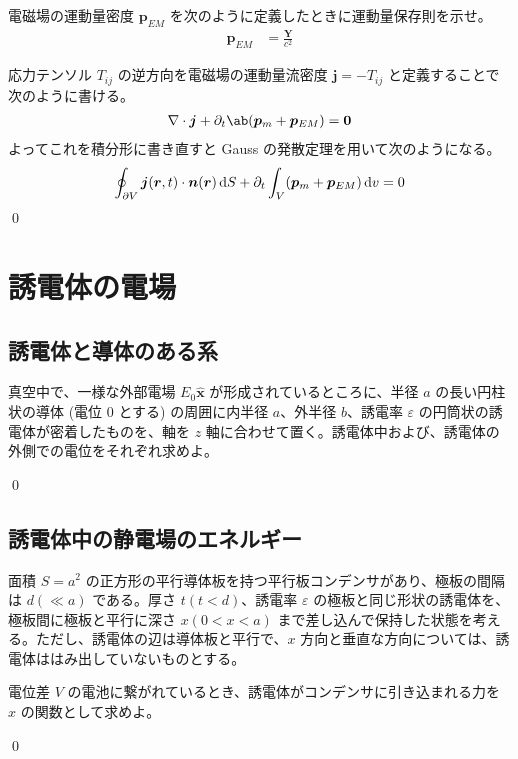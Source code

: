 \documentclass[uplatex,dvipdfmx,a4paper,11pt]{jlreq}
\makeatletter
\newcommand{\rr}{\bm{r}}
\newcommand{\pp}{\bm{p}}
\newcommand{\vnabla}{\mathbf{\nabla}}
\theoremstyle{definition}
\renewenvironment{proof}[1][\proofname]{\par
  \normalfont
  \topsep6\p@\@plus6\p@ \trivlist
  \item[\hskip\labelsep{\bfseries #1}\@addpunct{\bfseries}]\ignorespaces\quad\par
}{%
  \qed\endtrivlist\@endpefalse
}
\renewcommand\proofname{証明}
\makeatother
\begin{document}
\begin{problem}
電磁場の運動量密度 $\pp_{EM}$ を次のように定義したときに運動量保存則を示せ。
\begin{align}
  \pp_{EM} & = \frac{\bm{Y}}{c^2}
\end{align}
\end{problem}
\begin{proof}
  応力テンソル $T_{ij}$ の逆方向を電磁場の運動量流密度 $\bm{j} = -T_{ij}$ と定義することで次のように書ける。
  \begin{align}
    \vnabla\cdot\bm{j} + \partial_t\ab(\pp_m + \pp_{EM}) = \bm{0}
  \end{align}
  よってこれを積分形に書き直すと Gauss の発散定理を用いて次のようになる。
  \begin{align}
    \oint_{\partial V}\bm{j}(\rr, t)\cdot\bm{n}(\rr)\dl{S} + \partial_t\int_V(\pp_m + \pp_{EM})\dl{v} = 0
  \end{align}
\end{proof}

\section{誘電体の電場}

\setcounter{subsection}{5}
\subsection{誘電体と導体のある系}
\begin{problem}
真空中で、一様な外部電場 $E_0\hat{\bm{x}}$ が形成されているところに、半径 $a$ の長い円柱状の導体 (電位 $0$ とする) の周囲に内半径 $a$、外半径 $b$、誘電率 $\varepsilon$ の円筒状の誘電体が密着したものを、軸を $z$ 軸に合わせて置く。誘電体中および、誘電体の外側での電位をそれぞれ求めよ。
\end{problem}
\begin{proof}

\end{proof}

\subsection{誘電体中の静電場のエネルギー}
面積 $S = a^2$ の正方形の平行導体板を持つ平行板コンデンサがあり、極板の間隔は $d (\ll a)$ である。厚さ $t (t < d)$、誘電率 $\varepsilon$ の極板と同じ形状の誘電体を、極板間に極板と平行に深さ $x (0 < x < a)$ まで差し込んで保持した状態を考える。ただし、誘電体の辺は導体板と平行で、$x$ 方向と垂直な方向については、誘電体ははみ出していないものとする。
\begin{problem}
電位差 $V$ の電池に繋がれているとき、誘電体がコンデンサに引き込まれる力を $x$ の関数として求めよ。
\end{problem}
\begin{proof}

\end{proof}
\end{document}
